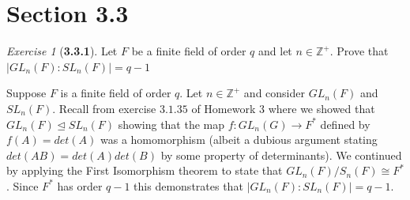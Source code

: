 \documentclass[12pt]{amsart}
\makeatletter
\theoremstyle{remark}
\newtheorem*{exercise}{Exercise}%
\def\ZZ{\ensuremath{\mathbb Z}}
\renewenvironment{proof}[1][\proofname]{\par\doublespacing
  \pushQED{\qed}%
  \normalfont \topsep6\p@\@plus6\p@\relax
  \list{}{%
    \settowidth{\leftmargin}{\itshape\proofname:\hskip\labelsep}%
    \setlength{\labelwidth}{0pt}%
    \setlength{\itemindent}{-\leftmargin}%
  }%
  \item[\hskip\labelsep\itshape#1\@addpunct{:}]\ignorespaces
}{%
  \popQED\endlist\@endpefalse
  \singlespacing
}
\theoremstyle{mycomment}
\makeatother
\begin{document}
\thispagestyle{fancy}
\author{Coordinator: Coordinator's Name}








\section*{\textbf{Section 3.3}}


\begin{exercise}[\textbf{3.3.1}] Let $F$ be a finite field of order $q$ and let $n \in \ZZ^+$. Prove that $|GL_n(F): SL_n(F)| = q - 1$
  \begin{proof} Suppose $F$ is a finite field of order $q$. Let $n \in \ZZ^+$ and consider $GL_n(F)$ and $SL_n(F)$. Recall from exercise $3.1.35$ of Homework 3 where we showed that $GL_n(F)\trianglelefteq SL_n(F)$ showing that the map $f: GL_n(G) \to F^*$ defined by $f(A) = det(A)$ was a homomorphism (albeit a dubious argument stating $det(AB) = det(A)det(B)$ by some property of determinants). We continued by applying the First Isomorphism theorem to state that $GL_n(F)/S_n(F) \cong F^*$. Since $F^*$ has order $q - 1$ this demonstrates that $|GL_n(F): SL_n(F)| = q - 1$. 
  \end{proof}
\end{exercise}
\vspace{.15in}
\end{document}
